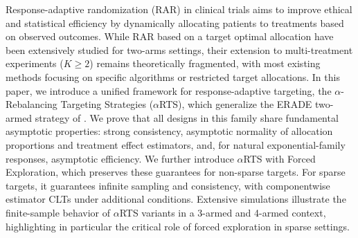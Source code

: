 
Response-adaptive randomization (RAR) in clinical trials aims to improve ethical and statistical efficiency by dynamically allocating patients to treatments based on observed outcomes. While RAR based on a target optimal allocation have been extensively studied for two-arms settings, their extension to multi-treatment experiments ($K \geq 2$) remains theoretically fragmented, with most existing methods focusing on specific algorithms or restricted target allocations.
In this paper, we introduce a unified framework for response-adaptive targeting, the $\alpha$-Rebalancing Targeting Strategies ($\alpha$RTS), which generalize the ERADE two-armed strategy of \cite{hu2009efficient}. We prove that all designs in this family share fundamental asymptotic properties: strong consistency, asymptotic normality of allocation proportions and treatment effect estimators, 
{\color{revisiongreen}and, for natural exponential-family responses, asymptotic efficiency}. 
 {\color{revisiongreen}We further introduce $\alpha$RTS with Forced Exploration, which preserves these guarantees for non-sparse targets. For sparse targets, it guarantees infinite sampling and consistency, with componentwise estimator CLTs under additional conditions.}
Extensive simulations illustrate the finite-sample behavior of $\alpha$RTS variants in a 3-armed and 4-armed context, highlighting in particular the critical role of forced exploration in sparse settings.


